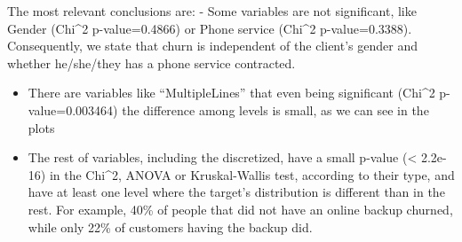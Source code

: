 \documentclass[
]{article}
\newenvironment{Shaded}{\begin{snugshade}}{\end{snugshade}}
\newcommand{\FunctionTok}[1]{\textcolor[rgb]{0.13,0.29,0.53}{\textbf{#1}}}
\newcommand{\NormalTok}[1]{#1}
\newcommand{\SpecialCharTok}[1]{\textcolor[rgb]{0.81,0.36,0.00}{\textbf{#1}}}
\newcommand{\StringTok}[1]{\textcolor[rgb]{0.31,0.60,0.02}{#1}}
\providecommand{\tightlist}{%
  \setlength{\itemsep}{0pt}\setlength{\parskip}{0pt}}
\begin{document}
The most relevant conclusions are: - Some variables are not significant,
like Gender (Chi\^{}2 p-value=0.4866) or Phone service (Chi\^{}2
p-value=0.3388). Consequently, we state that churn is independent of the
client's gender and whether he/she/they has a phone service contracted.

\begin{Shaded}
\end{Shaded}

\begin{itemize}
\tightlist
\item
  There are variables like ``MultipleLines'' that even being significant
  (Chi\^{}2 p-value=0.003464) the difference among levels is small, as
  we can see in the plots
\end{itemize}

\begin{Shaded}
\end{Shaded}

\begin{itemize}
\tightlist
\item
  The rest of variables, including the discretized, have a small p-value
  (\textless{} 2.2e-16) in the Chi\^{}2, ANOVA or Kruskal-Wallis test,
  according to their type, and have at least one level where the
  target's distribution is different than in the rest. For example, 40\%
  of people that did not have an online backup churned, while only 22\%
  of customers having the backup did.
\end{itemize}

\begin{Shaded}
\end{Shaded}
\end{document}
